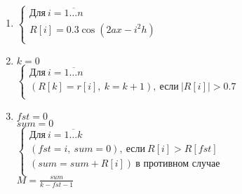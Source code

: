 \begin{enumerate}
    \item \(
    \begin{cases}
        \text{Для}\ i = \overline{1 \dots n}\\
        R[i] = 0.3\cos(2ax - i^2h)\\
    \end{cases}\)
    \item 
    \(k = 0\)\\[0.2cm]
    \(\begin{cases}
        \text{Для}\ i = \overline{1 \dots n}\\
        (R[k] = r[i],\ k = k + 1),\ \text{если}\ \vert R[i] \vert > 0.7\\
    \end{cases}\)
    \item 
    $fst = 0$\\
    $sum = 0$\\[0.2cm]
    $\begin{cases}
        \text{Для}\ i = \overline{1 \dots k}\\
        (fst = i,\ sum = 0),\ \text{если}\ R[i] > R[fst]\\
        (sum = sum + R[i])\ \text{в противном случае}\\    
    \end{cases}$\\
    \(\displaystyle M = \frac{sum}{k - fst - 1}\) 
\end{enumerate}